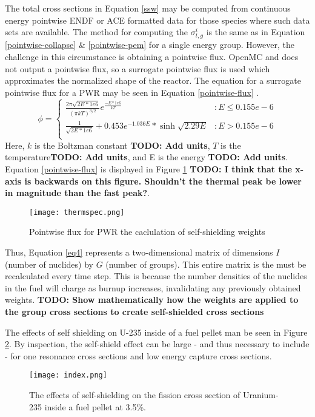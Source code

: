 \documentclass{article}
\newcommand{\TODO}[1] {{\color{red}\textbf{TODO: #1}}}
\begin{document}
The total cross sections in Equation \ref{ssw} may be computed from continuous energy
pointwise ENDF or ACE formatted data for those species where such data sets are available.
The method for computing the  $\sigma_{t,g}^i$ is the same as in Equation
\ref{pointwise-collapse} \& \ref{pointwise-pem} for a single energy group.  However,
the challenge in this circumstance is obtaining a pointwise flux. OpenMC and does not output
a pointwise flux, so a surrogate pointwise flux is used which approximates the normalized shape
of the reactor. The equation for a surrogate pointwise flux for a PWR may be seen in
Equation \ref{pointwise-flux} \cite{spectrum}.
\begin{equation}
\label{pointwise-flux}
\phi =
\begin{cases}
    \frac{2\pi\sqrt{2E*1e6}}{(\pi kT)^{3/2}}e^{\frac{-E*1e6}{kT}} & : E\leq 0.155e-6 \\
    \frac{1}{\sqrt{2E*1e6}} + 0.453e^{-1.036E}*\sinh{\sqrt{2.29E}} & : E > 0.155e-6 \\
\end{cases}
\end{equation}
Here, $k$ is the Boltzman constant \TODO{Add units}, $T$ is the temperature\TODO{Add units},
and E is the energy \TODO{Add units}. Equation \ref{pointwise-flux} is displayed in
Figure \ref{fig:therm} \TODO{I think that the x-axis is backwards on this figure. Shouldn't the
thermal peak be lower in magnitude than the fast peak?}.
\begin{figure}[h]
  \center
  \texttt{[image: thermspec.png]}
  \caption{Pointwise flux for PWR the caclulation of self-shielding weights}
  \label{fig:therm}
\end{figure}

Thus, Equation \ref{eq4} represents a two-dimensional matrix of dimensions
$I$ (number of nuclides) by $G$ (number of groups). This entire matrix is the
must be recalculated every time step. This is because the number densities of the nuclides
in the fuel will charge as burnup increases, invalidating any previously obtained weights.
\TODO{Show mathematically how the weights are applied to the group cross sections to
create self-shielded cross sections}

The effects of self shielding on U-235 inside of a fuel pellet man be seen in
Figure \ref{fig:index}. By inspection, the self-shield effect can be large - and thus
necessary to include - for one resonance cross sections and low energy capture cross sections.
\begin{figure}[h]
  \center
  \texttt{[image: index.png]}
  \caption{The effects of self-shielding on the fission cross section of Uranium-235 inside a fuel pellet at 3.5\%.}
  \label{fig:index}
\end{figure}
\end{document}

